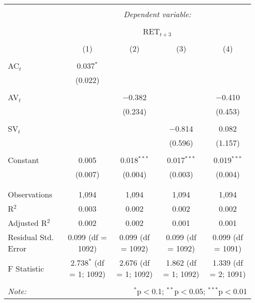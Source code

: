 
\begin{table}[!htbp] \centering 
  \caption{} 
  \label{} 
\begin{tabular}{@{\extracolsep{5pt}}lcccc} 
\\[-1.8ex]\hline 
\hline \\[-1.8ex] 
 & \multicolumn{4}{c}{\textit{Dependent variable:}} \\ 
\cline{2-5} 
\\[-1.8ex] & \multicolumn{4}{c}{RET$_{t+3}$} \\ 
\\[-1.8ex] & (1) & (2) & (3) & (4)\\ 
\hline \\[-1.8ex] 
 AC$_{t}$ & 0.037$^{*}$ &  &  &  \\ 
  & (0.022) &  &  &  \\ 
  & & & & \\ 
 AV$_{t}$ &  & $-$0.382 &  & $-$0.410 \\ 
  &  & (0.234) &  & (0.453) \\ 
  & & & & \\ 
 SV$_{t}$ &  &  & $-$0.814 & 0.082 \\ 
  &  &  & (0.596) & (1.157) \\ 
  & & & & \\ 
 Constant & 0.005 & 0.018$^{***}$ & 0.017$^{***}$ & 0.019$^{***}$ \\ 
  & (0.007) & (0.004) & (0.003) & (0.004) \\ 
  & & & & \\ 
\hline \\[-1.8ex] 
Observations & 1,094 & 1,094 & 1,094 & 1,094 \\ 
R$^{2}$ & 0.003 & 0.002 & 0.002 & 0.002 \\ 
Adjusted R$^{2}$ & 0.002 & 0.002 & 0.001 & 0.001 \\ 
Residual Std. Error & 0.099 (df = 1092) & 0.099 (df = 1092) & 0.099 (df = 1092) & 0.099 (df = 1091) \\ 
F Statistic & 2.738$^{*}$ (df = 1; 1092) & 2.676 (df = 1; 1092) & 1.862 (df = 1; 1092) & 1.339 (df = 2; 1091) \\ 
\hline 
\hline \\[-1.8ex] 
\textit{Note:}  & \multicolumn{4}{r}{$^{*}$p$<$0.1; $^{**}$p$<$0.05; $^{***}$p$<$0.01} \\ 
\end{tabular} 
\end{table} 
